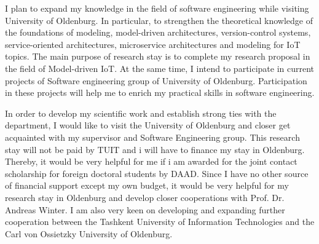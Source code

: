 \documentclass[10pt, oneside]{article}
\begin{document}
I plan to expand my knowledge in the field of software engineering while visiting University of Oldenburg. In particular, to strengthen the theoretical knowledge of the foundations of modeling, model-driven architectures, version-control systems, service-oriented architectures, microservice architectures and modeling for IoT topics. The main purpose of research stay is to complete my research proposal in the field of Model-driven IoT. At the same time, I intend to participate in current projects of Software engineering group of University of Oldenburg. Participation in these projects will help me to enrich my practical skills in software engineering.

In order to develop my scientific work and establish strong ties with the department, I would like to visit the University of Oldenburg and closer get acquainted with my supervisor and Software Engineering group. This research stay will not be paid by TUIT and i will have to finance my stay in Oldenburg. Thereby, it would be very helpful for me if i am awarded for the joint contact scholarship for foreign doctoral students by DAAD. Since I have no other source of financial support except my own budget, it would be very helpful for my research stay in Oldenburg and develop closer cooperations with Prof. Dr. Andreas Winter.
I am also very keen on developing and expanding further cooperation between the Tashkent University of Information Technologies and the Carl von Ossietzky University of Oldenburg. 
\end{document}

